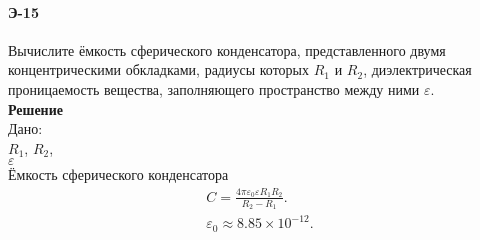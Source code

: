 \documentclass[__main__.tex]{subfiles}
\begin{document}
\paragraph{Э-15}
Вычислите ёмкость сферического конденсатора, представленного двумя концентрическими обкладками, радиусы которых $R_1$ и $R_2$, диэлектрическая проницаемость вещества, заполняющего пространство между ними $\varepsilon$.\\
\textbf{Решение}\\
Дано:\\
$R_1$, $R_2$,\\
$\varepsilon$\\

Ёмкость сферического конденсатора \\
\begin{gather*}
C=\frac{4\pi\varepsilon_0\varepsilon R_1R_2}{R_2-R_1}.\\
\varepsilon_0\approx8.85\times10^{-12}.
\end{gather*}
\end{document}
